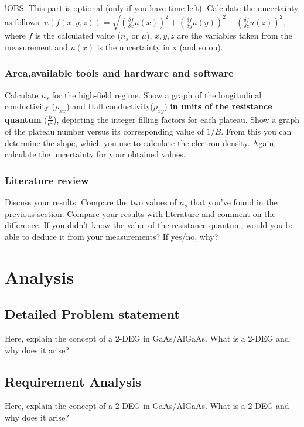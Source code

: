 \documentclass[a4paper]{report}
\begin{document}
    !OBS: This part is optional (only if you have time left).
    Calculate the uncertainty as follows: \newline $u(f(x, y, z)) = \sqrt{(\frac{\delta f}{\delta{x}} u(x))^{2} + (\frac{\delta f}{\delta{y}} u(y))^{2} + (\frac{\delta f}{\delta{z}} u(z))^{2}}$, where $f$ is the calculated value ($n_{s}$ or $\mu$), $x, y, z$ are the variables taken from the measurement and $u(x)$ is the uncertainty in x (and so on).
    
    \subsection{Area,available tools and hardware and software}
    Calculate $n_{s}$ for the high-field regime.
    Show a graph of the longitudinal conductivity ($\rho_{xx}$) and Hall conductivity($\rho_{xy}$) \textbf{in units of the resistance quantum} ($\frac{h}{e^{2}}$), depicting the integer filling factors for each plateau.
    Show a graph of the plateau number versus its corresponding value of $1/B$. From this you can determine the slope, which you use to calculate the electron density.
    Again, calculate the uncertainty for your obtained values.
    
    \subsection{Literature review}
    Discuss your results. Compare the two values of $n_{s}$ that you've found in the previous section. Compare your results with literature and comment on the difference. If you didn't know the value of the resistance quantum, would you be able to deduce it from your measurements? If yes/no, why?
    
    \chapter {Analysis}
    \section{Detailed Problem statement}
    \label{sec:theory}
    Here, explain the concept of a 2-DEG in GaAs/AlGaAs. What is a 2-DEG and why does it arise?
    \section{Requirement Analysis}
    Here, explain the concept of a 2-DEG in GaAs/AlGaAs. What is a 2-DEG and why does it arise?
\end{document}
